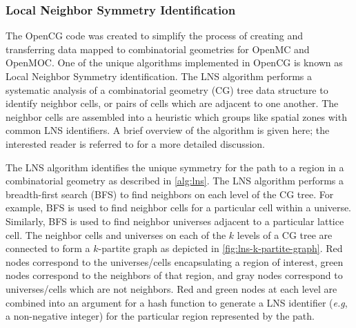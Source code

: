 \subsubsection{Local Neighbor Symmetry Identification}
\label{subsubsec:homogenize-lns}

The OpenCG code \citep{boyd2015opencg} was created to simplify the process of creating and transferring data mapped to combinatorial geometries for OpenMC and OpenMOC. One of the unique algorithms implemented in OpenCG is known as Local Neighbor Symmetry identification. The LNS algorithm performs a systematic analysis of a combinatorial geometry (CG) tree data structure to identify neighbor cells, or pairs of cells which are adjacent to one another. The neighbor cells are assembled into a heuristic which groups like spatial zones with common LNS identifiers. A brief overview of the algorithm is given here; the interested reader is referred to \citep{boyd2015opencg} for a more detailed discussion.

The LNS algorithm identifies the unique symmetry for the path to a region in a combinatorial geometry as described in \autoref{alg:lns}. The LNS algorithm performs a breadth-first search (BFS) to find neighbors on each level of the CG tree. For example, BFS is used to find neighbor cells for a particular cell within a universe. Similarly, BFS is used to find neighbor universes adjacent to a particular lattice cell. The neighbor cells and universes on each of the $k$ levels of a CG tree are connected to form a $k$-partite graph as depicted in \autoref{fig:lns-k-partite-graph}. Red nodes correspond to the universes/cells encapsulating a region of interest, green nodes correspond to the neighbors of that region, and gray nodes correspond to universes/cells which are not neighbors. Red and green nodes at each level are combined into an argument for a hash function to generate a LNS identifier (\textit{e.g}, a non-negative integer) for the particular region represented by the path.

